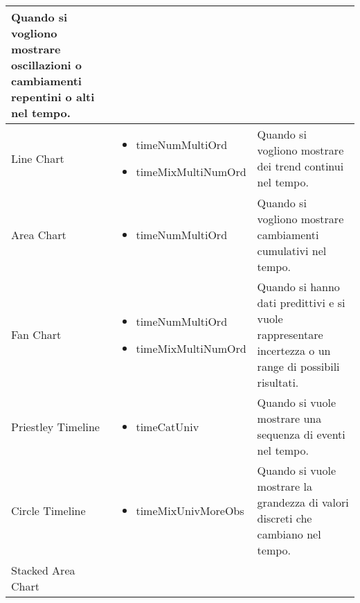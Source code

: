 \begin{xltabular}{\columnwidth}{|p{0.15\columnwidth}|X|p{0.27\columnwidth}|}
    Quando si vogliono mostrare oscillazioni o cambiamenti repentini o alti nel tempo. \\
    \hline
    Line Chart & 
    \vspace{-3.5mm}
    \begin{itemize}[noitemsep,topsep=0pt, left=0pt]
        \item timeNumMultiOrd
        \item timeMixMultiNumOrd
    \end{itemize} & 
    Quando si vogliono mostrare dei trend continui nel tempo. \\
    \hline
    Area Chart & 
    \vspace{-3.5mm}
    \begin{itemize}[noitemsep,topsep=0pt, left=0pt]
        \item timeNumMultiOrd
    \end{itemize} & 
    Quando si vogliono mostrare cambiamenti cumulativi nel tempo. \\
    \hline
    Fan Chart & 
    \vspace{-3.5mm}
    \begin{itemize}[noitemsep,topsep=0pt, left=0pt]
        \item timeNumMultiOrd
        \item timeMixMultiNumOrd
    \end{itemize} & 
    Quando si hanno dati predittivi e si vuole rappresentare incertezza o un range di possibili risultati. \\
    \hline
    Priestley Timeline & 
    \vspace{-3.5mm}
    \begin{itemize}[noitemsep,topsep=0pt, left=0pt]
        \item timeCatUniv
    \end{itemize} & 
    Quando si vuole mostrare una sequenza di eventi nel tempo. \\
    \hline
    Circle Timeline & 
    \vspace{-3.5mm}
    \begin{itemize}[noitemsep,topsep=0pt, left=0pt]
        \item timeMixUnivMoreObs
    \end{itemize} & 
    Quando si vuole mostrare la grandezza di valori discreti che cambiano nel tempo. \\
    \hline
    Stacked Area Chart & 
    \vspace{-3.5mm}
    \begin{itemize}[noitemsep,topsep=0pt, left=0pt]

\end{itemize}
\end{xltabular}
